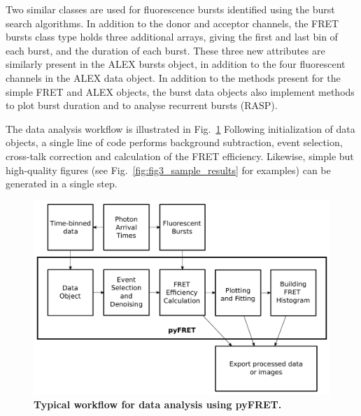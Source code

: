 Two similar classes are used for fluorescence bursts identified using the burst search algorithms. In addition to the donor and acceptor channels, the FRET bursts class type holds three additional arrays, giving the first and last bin of each burst, and the duration of each burst. These three new attributes are similarly present in the ALEX bursts object, in addition to the four fluorescent channels in the ALEX data object. In addition to the methods present for the simple FRET and ALEX objects, the burst data objects also implement methods to plot burst duration and to analyse recurrent bursts (RASP). 

The data analysis workflow is illustrated in Fig.~\ref{fig:fig2_workflow} Following initialization of data objects, a single line of code performs background subtraction, event selection, cross-talk correction and calculation of the FRET efficiency. Likewise, simple but high-quality figures (see Fig.~\ref{fig:fig3_sample_results} for examples) can be generated in a single step.

\begin{figure}[!ht]
   \begin{center}
      \includegraphics*[clip=true, width=6in]{pyFRET/workflow_new.pdf}
      \caption{{\bf Typical workflow for data analysis using pyFRET.}}
      \label{fig:fig2_workflow}
   \end{center}
\end{figure}

